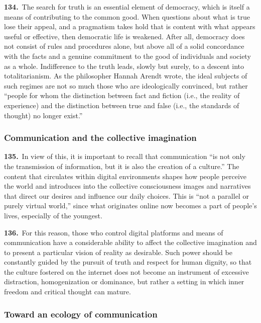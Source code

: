 \documentclass{article}
\begin{document}
\textbf{134.}\ The search for truth is an essential element of democracy, which is itself a means of contributing to the common good. When questions about what is true lose their appeal, and a pragmatism takes hold that is content with what appears useful or effective, then democratic life is weakened. After all, democracy does not consist of rules and procedures alone, but above all of a solid concordance with the facts and a genuine commitment to the good of individuals and society as a whole. Indifference to the truth leads, slowly but surely, to a descent into totalitarianism. As the philosopher Hannah Arendt wrote, the ideal subjects of such regimes are not so much those who are ideologically convinced, but rather ``people for whom the distinction between fact and fiction (i.e., the reality of experience) and the distinction between true and false (i.e., the standards of thought) no longer exist.''\cite{n143}

\subsubsection{Communication and the collective imagination}

\textbf{135.}\ In view of this, it is important to recall that communication ``is not only the transmission of information, but it is also the creation of a culture.''\cite{n144} The content that circulates within digital environments shapes how people perceive the world and introduces into the collective consciousness images and narratives that direct our desires and influence our daily choices. This is ``not a parallel or purely virtual world,''\cite{n145} since what originates online now becomes a part of people's lives, especially of the youngest.

\textbf{136.}\ For this reason, those who control digital platforms and means of communication have a considerable ability to affect the collective imagination and to present a particular vision of reality as desirable. Such power should be constantly guided by the pursuit of truth and respect for human dignity, so that the culture fostered on the internet does not become an instrument of excessive distraction, homogenization or dominance, but rather a setting in which inner freedom and critical thought can mature.

\subsubsection{Toward an ecology of communication}
\end{document}

